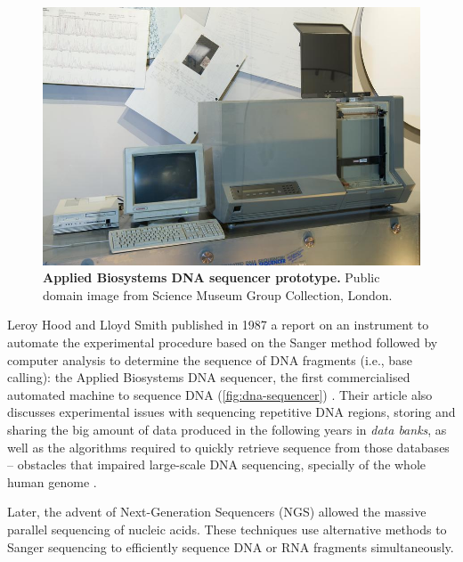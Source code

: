\begin{figure}
  \includegraphics[width=\linewidth]{images/intro/dna-sequencer}
  \caption[Applied Biosystems DNA sequencer prototype]{\textbf{Applied Biosystems DNA sequencer prototype.} Public domain image from Science Museum Group Collection, London.}
  \label{fig:dna-sequencer}
\end{figure}

Leroy Hood and Lloyd Smith published in 1987 a report on an instrument to automate the experi\-mental procedure based on the Sanger method followed by computer analysis to determine the sequence of DNA fragments (i.e., base calling): the Applied Biosystems DNA sequencer, the first commercialised automated machine to sequence DNA (\autoref{fig:dna-sequencer}) \cite{hood:1987va}. Their article also discusses experimental issues with sequencing repetitive DNA regions, storing and sharing the big amount of data produced in the following years in \emph{data banks}, as well as the algorithms required to quickly retrieve sequence from those databases -- obstacles that impaired large-scale DNA sequencing, specially of the whole human genome \cite{hood:1987va}.

Later, the advent of Next-Generation Sequencers (NGS) allowed the massive parallel sequencing of nucleic acids. These techniques use alternative methods to Sanger sequencing to efficiently sequence DNA or RNA fragments simultaneously.

